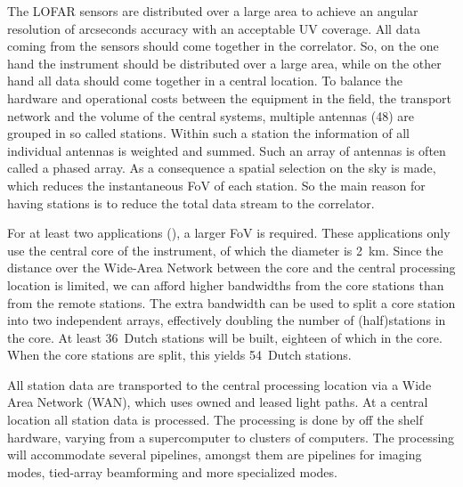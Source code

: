 \documentclass[journal]{IEEEtran}
\begin{document}
The LOFAR sensors are distributed over a large area to achieve an angular
resolution of arcseconds accuracy with an acceptable UV coverage.
All data coming from the sensors should come together in the correlator. So, on the one hand the instrument should be distributed over a large area, while on the other hand all data should come together in a central location. To balance the hardware and operational costs between the equipment in the field, the transport network and the volume of the central systems, multiple antennas (48) are grouped in so called stations. Within such a station the information of all individual antennas is weighted and summed. Such an array of antennas is often called a phased array. As a consequence a spatial selection on the sky is made, which reduces the instantaneous FoV of each station. So the main reason for having stations is to reduce the total data stream to the correlator.

For at least two applications (), a larger FoV is required.
These applications only use the central core of the instrument, of which the
diameter is 2~km.
Since the distance over the Wide-Area Network between the core and the central
processing location is limited, we can afford higher bandwidths from the
core stations than from the remote stations.
The extra bandwidth can be used to split a core station into two independent
arrays, effectively doubling the number of (half)stations in the core.
At least 36~Dutch stations will be built, eighteen of which in the core.
When the core stations are split, this yields 54~Dutch stations.

All station data are transported to the central processing location via a
Wide Area Network (WAN), which uses owned and leased light paths.
At a central location all station data is processed. The processing is done by off the shelf hardware, varying from a supercomputer to clusters of computers. The processing will accommodate several pipelines, amongst them are pipelines for imaging modes, tied-array beamforming and more specialized modes.


 


\end{document}
